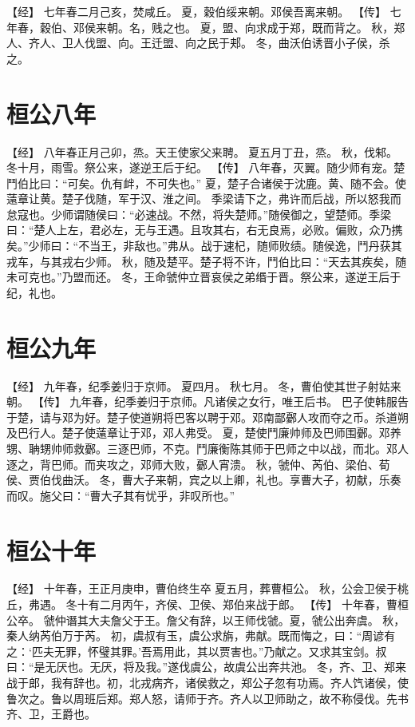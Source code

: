 \documentclass[a4paper,12pt,UTF8,twoside]{ctexbook}
\begin{document}
【经】
七年春二月己亥，焚咸丘。
夏，穀伯绥来朝。邓侯吾离来朝。
【传】
七年春，穀伯、邓侯来朝。名，贱之也。
夏，盟、向求成于郑，既而背之。
秋，郑人、齐人、卫人伐盟、向。王迁盟、向之民于郏。
冬，曲沃伯诱晋小子侯，杀之。

\chapter{桓公八年}

【经】
八年春正月己卯，烝。天王使家父来聘。
夏五月丁丑，烝。
秋，伐邾。
冬十月，雨雪。祭公来，遂逆王后于纪。
【传】
八年春，灭翼。随少师有宠。楚鬥伯比曰：“可矣。仇有衅，不可失也。”
夏，楚子合诸侯于沈鹿。黄、随不会。使薳章让黄。楚子伐随，军于汉、淮之间。
季梁请下之，弗许而后战，所以怒我而怠寇也。少师谓随侯曰：“必速战。不然，将失楚师。”随侯御之，望楚师。季梁曰：“楚人上左，君必左，无与王遇。且攻其右，右无良焉，必败。偏败，众乃携矣。”少师曰：“不当王，非敌也。”弗从。战于速杞，随师败绩。随侯逸，鬥丹获其戎车，与其戎右少师。
秋，随及楚平。楚子将不许，鬥伯比曰：“天去其疾矣，随未可克也。”乃盟而还。
冬，王命虢仲立晋哀侯之弟缗于晋。祭公来，遂逆王后于纪，礼也。

\chapter{桓公九年}

【经】
九年春，纪季姜归于京师。
夏四月。
秋七月。
冬，曹伯使其世子射姑来朝。
【传】
九年春，纪季姜归于京师。凡诸侯之女行，唯王后书。
巴子使韩服告于楚，请与邓为好。楚子使道朔将巴客以聘于邓。邓南鄙鄾人攻而夺之币。杀道朔及巴行人。楚子使薳章让于邓，邓人弗受。
夏，楚使鬥廉帅师及巴师围鄾。邓养甥、聃甥帅师救鄾。三逐巴师，不克。鬥廉衡陈其师于巴师之中以战，而北。邓人逐之，背巴师。而夹攻之，邓师大败，鄾人宵溃。
秋，虢仲、芮伯、梁伯、荀侯、贾伯伐曲沃。
冬，曹大子来朝，宾之以上卿，礼也。享曹大子，初献，乐奏而叹。施父曰：“曹大子其有忧乎，非叹所也。”

\chapter{桓公十年}

【经】
十年春，王正月庚申，曹伯终生卒
夏五月，葬曹桓公。
秋，公会卫侯于桃丘，弗遇。
冬十有二月丙午，齐侯、卫侯、郑伯来战于郎。
【传】
十年春，曹桓公卒。
虢仲谮其大夫詹父于王。詹父有辞，以王师伐虢。夏，虢公出奔虞。
秋，秦人纳芮伯万于芮。
初，虞叔有玉，虞公求旃，弗献。既而悔之，曰：“周谚有之：‘匹夫无罪，怀璧其罪。’吾焉用此，其以贾害也。”乃献之。又求其宝剑。叔曰：“是无厌也。无厌，将及我。”遂伐虞公，故虞公出奔共池。
冬，齐、卫、郑来战于郎，我有辞也。初，北戎病齐，诸侯救之，郑公子忽有功焉。齐人饩诸侯，使鲁次之。鲁以周班后郑。郑人怒，请师于齐。齐人以卫师助之，故不称侵伐。先书齐、卫，王爵也。
\end{document}
